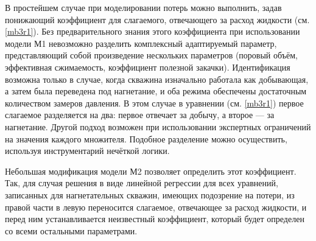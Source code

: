 \documentclass[14pt]{article}
\begin{document}
В простейшем случае при моделировании потерь можно выполнить, задав понижающий коэффициент для слагаемого, отвечающего за расход жидкости (см. \ref{mb3r1}). Без предварительного знания этого коэффициента при использовании модели М1 невозможно разделить комплексный адаптируемый параметр, представляющий собой произведение нескольких параметров (поровый объём, эффективная сжимаемость, коэффициент полезной закачки). Идентификация возможна только в случае, когда скважина изначально работала как добывающая, а затем была переведена под нагнетание, и оба режима обеспечены достаточным количеством замеров давления. В этом случае в уравнении (см. \ref{mb3r1}) первое слагаемое разделяется на два: первое отвечает за добычу, а второе — за нагнетание.
Другой подход возможен при использовании экспертных ограничений на значения каждого множителя. Подобное разделение можно осуществить, используя инструментарий нечёткой логики.

Небольшая модификация модели М2 позволяет определить этот коэффициент. Так, для случая решения в виде линейной регрессии для всех уравнений, записанных для нагнетательных скважин, имеющих подозрение на потери, из правой части в левую переносится слагаемое, отвечающее за расход жидкости, и перед ним устанавливается неизвестный коэффициент, который будет определен со всеми остальными параметрами.
\end{document}

